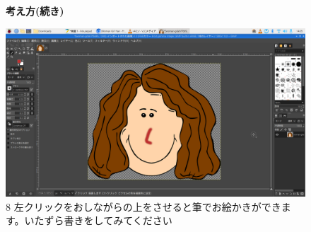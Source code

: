 \begin{figure}[ht]
  \textbf{考え方(続き)}

  \begin{minipage}{0.4\textwidth}
    \includegraphics[width=\linewidth]{text01-img/textbook-img131.png}\\
    8 左クリックをおしながらの上をさせると筆でお絵かきができます。いたずら書きをしてみてください
  \end{minipage}
  \hspace{1cm}
  \begin{minipage}{0.6\textwidth}
  \end{minipage}

  \bigskip


\end{figure}

